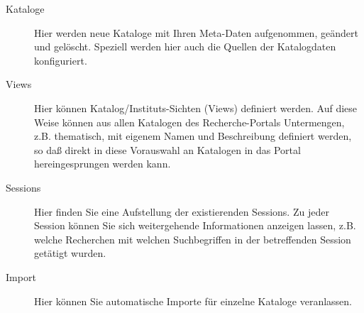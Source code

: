 \documentclass[11pt, twoside, a4paper, BCOR8mm, DIV12, bibtotoc,idxtotoc]{scrbook}
\begin{document}
\begin{description}
\item[Kataloge] Hier werden neue Kataloge mit Ihren Meta-Daten
  aufgenommen, geändert und gelöscht. Speziell werden hier auch die
  Quellen der Katalogdaten konfiguriert.
\item[Views] Hier können Katalog/Instituts-Sichten (Views) definiert
  werden. Auf diese Weise können aus allen Katalogen des
  Recherche-Portals Untermengen, z.B. thematisch, mit eigenem Namen
  und Beschreibung definiert werden, so daß direkt in diese
  Vorauswahl an Katalogen in das Portal hereingesprungen werden kann.
\item[Sessions] Hier finden Sie eine Aufstellung der existierenden
  Sessions. Zu jeder Session können Sie sich weitergehende
  Informationen anzeigen lassen, z.B. welche Recherchen mit welchen
  Suchbegriffen in der betreffenden Session getätigt wurden.
\item[Import] Hier können Sie automatische Importe für einzelne
  Kataloge veranlassen.
\end{description}
\end{document}
